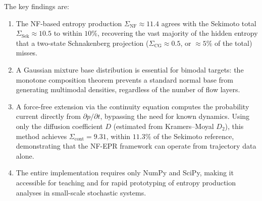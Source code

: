 The key findings are:
\begin{enumerate}
    \item The NF-based entropy production $\Sigma_{\mathrm{NF}} \approx \num{11.4}$ agrees with the Sekimoto total $\Sigma_{\mathrm{Sek}} \approx \num{10.5}$ to within $\num{10}\%$, recovering the vast majority of the hidden entropy that a two-state Schnakenberg projection ($\Sigma_{\mathrm{CG}} \approx \num{0.5}$, or $\approx\num{5}\%$ of the total) misses.
    \item A Gaussian mixture base distribution is essential for bimodal targets: the monotone composition theorem prevents a standard normal base from generating multimodal densities, regardless of the number of flow layers.
    \item A force-free extension via the continuity equation computes the probability current directly from $\partial p/\partial t$, bypassing the need for known dynamics.
    Using only the diffusion coefficient $D$ (estimated from Kramers--Moyal $D_2$), this method achieves $\Sigma_{\mathrm{cont}} = \num{9.31}$, within $\num{11.3}\%$ of the Sekimoto reference, demonstrating that the NF-EPR framework can operate from trajectory data alone.
    \item The entire implementation requires only NumPy and SciPy, making it accessible for teaching and for rapid prototyping of entropy production analyses in small-scale stochastic systems.
\end{enumerate}
